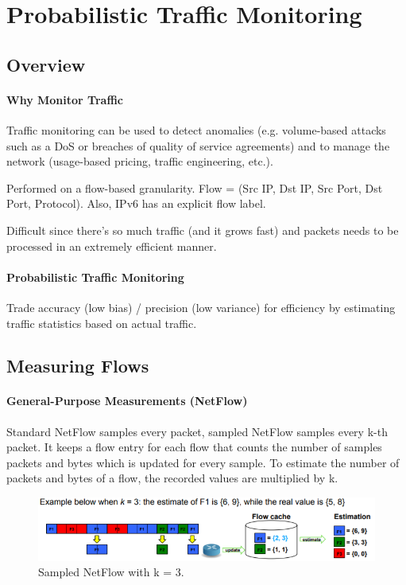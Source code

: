 \section{Probabilistic Traffic Monitoring}


\subsection{Overview}

\paragraph{Why Monitor Traffic}
Traffic monitoring can be used to detect anomalies (e.g. volume-based attacks such as a DoS or breaches of quality of service agreements) and to manage the network (usage-based pricing, traffic engineering, etc.).

Performed on a flow-based granularity. Flow = (Src IP, Dst IP, Src Port, Dst Port, Protocol). Also, IPv6 has an explicit flow label.

Difficult since there's so much traffic (and it grows fast) and packets needs to be processed in an extremely efficient manner.

\paragraph{Probabilistic Traffic Monitoring}
Trade accuracy (low bias) / precision (low variance) for efficiency by estimating traffic statistics based on actual traffic. 

\subsection{Measuring Flows}

\paragraph{General-Purpose Measurements (NetFlow)}
Standard NetFlow samples every packet, sampled NetFlow samples every k-th packet. It keeps a flow entry for each flow that counts the number of samples packets and bytes which is updated for every sample. To estimate the number of packets and bytes of a flow, the recorded values are multiplied by k.

\begin{figure}[h]
	\centering
	\includegraphics[scale=0.8]{images/917-netflow.PNG}
	\caption{Sampled NetFlow with k = 3.}
	\label{fig:netflow}
\end{figure}

